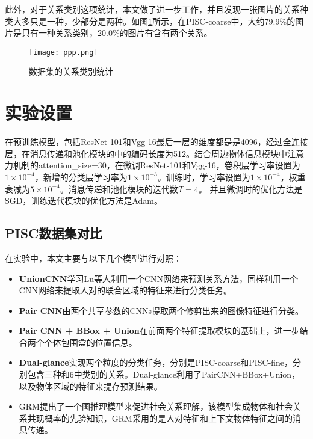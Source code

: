 此外，对于关系类别这项统计，本文做了进一步工作，并且发现一张图片的关系种类大多只是一种，少部分是两种。如图\ref{fig:exp-statistic}所示，在PISC-coarse中，大约79.9\%的图片是只有一种关系类别，20.0\%的图片有含有两个关系。

\begin{figure}[htpb]
	\centering
	\texttt{[image: ppp.png]}
    \caption{数据集的关系类别统计}
	\vspace*{-3.5mm}
	\label{fig:exp-statistic}
\end{figure}

\section{实验设置}

在预训练模型，包括ResNet-101和Vgg-16最后一层的维度都是是4096，经过全连接层，在消息传递和池化模块的中的编码长度为512。结合周边物体信息模块中注意力机制的attention\_size=30，在微调ResNet-101和Vgg-16，卷积层学习率设置为$1 \times 10^{-4}$，新增的分类层学习率为$1 \times 10^{-3}$。训练时，学习率设置为$1 \times 10^{-4}$，权重衰减为$5 \times 10^{-4}$。消息传递和池化模块的迭代数$T=4$。 并且微调时的优化方法是SGD，训练迭代模块的优化方法是Adam。

\subsection{PISC数据集对比}
在实验中，本文主要与以下几个模型进行对照：
\begin{itemize}
    \item \textbf{UnionCNN}学习Lu等人\cite{lu2016visual}利用一个CNN网络来预测关系方法，同样利用一个CNN网络来提取人对的联合区域的特征来进行分类任务。
    \item \textbf{Pair CNN}\cite{li2017dual-glance}由两个共享参数的CNNs提取两个修剪出来的图像特征进行分类。
    \item \textbf{Pair CNN + BBox + Union}\cite{li2017dual-glance}在前面两个特征提取模块的基础上，进一步结合两个个体包围盒的位置信息。
    \item \textbf{Dual-glance}\cite{li2017dual-glance}实现两个粒度的分类任务，分别是PISC-coarse和PISC-fine，分别包含三种和6中类别的关系。Dual-glance利用了PairCNN+BBox+Union，以及物体区域的特征来提存预测结果。
    \item GRM\cite{wang2018deep}提出了一个图推理模型来促进社会关系理解，该模型集成物体和社会关系共现概率的先验知识，GRM采用的是人对特征和上下文物体特征之间的消息传递。
\end{itemize}

